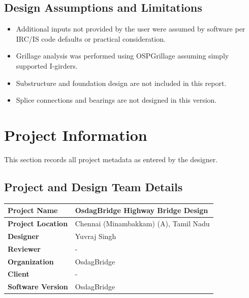 \documentclass[12pt,a4paper]{report}
\numberwithin{table}{chapter}
\numberwithin{figure}{chapter}
\begin{document}
\section*{Design Assumptions and Limitations}
\label{sec:assumptions}

\begin{itemize}
\item Additional inputs not provided by the user were assumed by software per IRC/IS code defaults or practical consideration.
\item Grillage analysis was performed using OSPGrillage assuming simply supported I-girders.
\item Substructure and foundation design are not included in this report.
\item Splice connections and bearings are not designed in this version.
\end{itemize}

\titleformat{\chapter}[block]{\normalfont\Large\bfseries\centering}{\thechapter}{1em}{}
\titlespacing*{\chapter}{0pt}{-30pt}{10pt}


\chapter{Project Information}

This section records all project metadata as entered by the designer.

\section{Project and Design Team Details}
\label{sec:project-details}

\begin{tabular}{|L{5.5cm}|L{8.5cm}|}
\hline
\textbf{Project Name} & OsdagBridge Highway Bridge Design \\
\hline
\textbf{Project Location} & Chennai (Minambakkam) (A), Tamil Nadu \\
\hline
\textbf{Designer} & Yuvraj Singh \\
\hline
\textbf{Reviewer} & - \\
\hline
\textbf{Organization} & OsdagBridge \\
\hline
\textbf{Client} & - \\
\hline
\textbf{Software Version} & OsdagBridge \\
\hline
\end{tabular}
\end{document}
